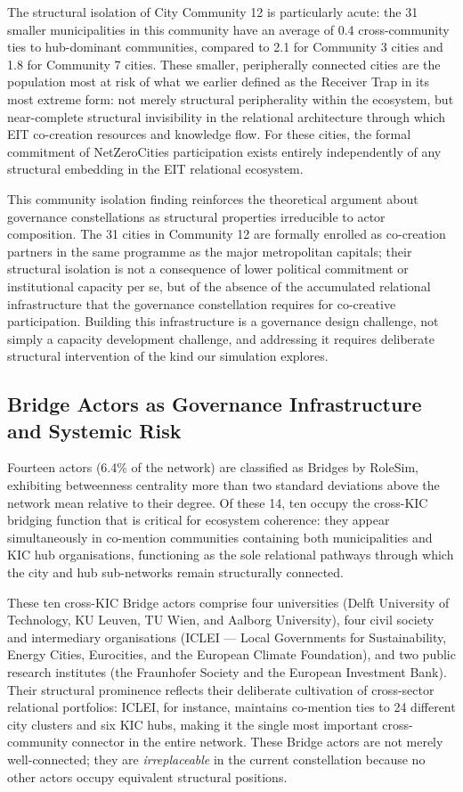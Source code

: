 \documentclass[review,12pt]{elsarticle}
\begin{document}
The structural isolation of City Community 12 is particularly acute: the 31 smaller municipalities in this community have an average of 0.4 cross-community ties to hub-dominant communities, compared to 2.1 for Community 3 cities and 1.8 for Community 7 cities. These smaller, peripherally connected cities are the population most at risk of what we earlier defined as the Receiver Trap in its most extreme form: not merely structural peripherality within the ecosystem, but near-complete structural invisibility in the relational architecture through which EIT co-creation resources and knowledge flow. For these cities, the formal commitment of NetZeroCities participation exists entirely independently of any structural embedding in the EIT relational ecosystem.

This community isolation finding reinforces the theoretical argument about governance constellations as structural properties irreducible to actor composition. The 31 cities in Community 12 are formally enrolled as co-creation partners in the same programme as the major metropolitan capitals; their structural isolation is not a consequence of lower political commitment or institutional capacity per se, but of the absence of the accumulated relational infrastructure that the governance constellation requires for co-creative participation. Building this infrastructure is a governance design challenge, not simply a capacity development challenge, and addressing it requires deliberate structural intervention of the kind our simulation explores.

\subsection{Bridge Actors as Governance Infrastructure and Systemic Risk}

Fourteen actors (6.4\% of the network) are classified as Bridges by RoleSim, exhibiting betweenness centrality more than two standard deviations above the network mean relative to their degree. Of these 14, ten occupy the cross-KIC bridging function that is critical for ecosystem coherence: they appear simultaneously in co-mention communities containing both municipalities and KIC hub organisations, functioning as the sole relational pathways through which the city and hub sub-networks remain structurally connected.

These ten cross-KIC Bridge actors comprise four universities (Delft University of Technology, KU Leuven, TU Wien, and Aalborg University), four civil society and intermediary organisations (ICLEI --- Local Governments for Sustainability, Energy Cities, Eurocities, and the European Climate Foundation), and two public research institutes (the Fraunhofer Society and the European Investment Bank). Their structural prominence reflects their deliberate cultivation of cross-sector relational portfolios: ICLEI, for instance, maintains co-mention ties to 24 different city clusters and six KIC hubs, making it the single most important cross-community connector in the entire network. These Bridge actors are not merely well-connected; they are \emph{irreplaceable} in the current constellation because no other actors occupy equivalent structural positions.
\end{document}
